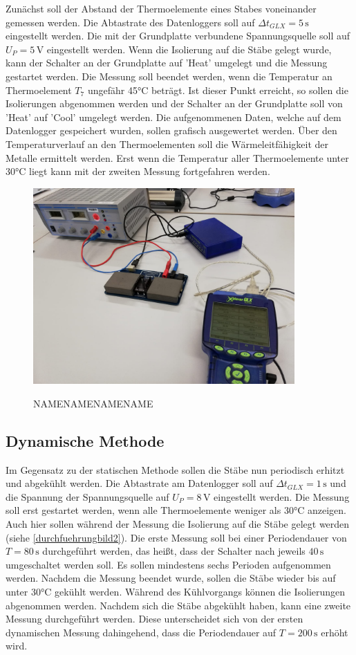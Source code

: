 Zunächst soll der Abstand der Thermoelemente eines Stabes voneinander gemessen werden.
Die Abtastrate des Datenloggers soll auf $\Delta t_{GLX} = 5\, \si{\second}$ eingestellt werden.
Die mit der Grundplatte verbundene Spannungsquelle soll auf $U_P = 5\, \si{\volt}$ eingestellt 
werden. Wenn die Isolierung auf die Stäbe gelegt wurde, kann der Schalter an der Grundplatte auf
'Heat' umgelegt und die Messung gestartet werden. Die Messung soll beendet werden, wenn die 
Temperatur an Thermoelement $T_7$ ungefähr 45°C beträgt. Ist dieser Punkt erreicht, so sollen 
die Isolierungen abgenommen werden und der Schalter an der Grundplatte soll von 'Heat' auf
'Cool' umgelegt werden. Die aufgenommenen Daten, welche auf dem Datenlogger gespeichert wurden,
sollen grafisch ausgewertet werden. Über den Temperaturverlauf an den Thermoelementen soll 
die Wärmeleitfähigkeit der Metalle ermittelt werden. Erst wenn die Temperatur aller Thermoelemente unter 30°C 
liegt kann mit der zweiten Messung fortgefahren werden.


\begin{figure}[H]
    \centering
    \includegraphics[width=10cm]{content/204.jpg}
    \label{fig:durchfuehrungbild2}
    \caption{NAMENAMENAMENAME}
\end{figure}


\subsection{Dynamische Methode}

Im Gegensatz zu der statischen Methode sollen die Stäbe nun periodisch erhitzt und 
abgekühlt werden. Die Abtastrate am Datenlogger soll auf $\Delta t_{GLX} = 1\, \si{\second}$
und die Spannung der Spannungsquelle auf $U_P = 8\, \si{\volt}$ eingestellt werden. Die Messung soll
erst gestartet werden, wenn alle Thermoelemente weniger als 30°C anzeigen. Auch hier sollen während 
der Messung die Isolierung auf die Stäbe gelegt werden (siehe \ref{durchfuehrungbild2}). Die erste Messung soll bei einer Periodendauer
von $T = 80\, \si{\second}$ durchgeführt werden, das heißt, dass der Schalter nach jeweils 
$40\, \si{\second}$ umgeschaltet werden soll. Es sollen mindestens sechs Perioden 
aufgenommen werden.
Nachdem die Messung beendet wurde, sollen die Stäbe wieder bis auf unter 30°C gekühlt werden.
Während des Kühlvorgangs können die Isolierungen abgenommen werden. Nachdem sich die Stäbe 
abgekühlt haben, kann eine zweite Messung durchgeführt werden. Diese unterscheidet sich von der
ersten dynamischen Messung dahingehend, dass die Periodendauer auf $T = 200\, \si{\second}$ 
erhöht wird.  
